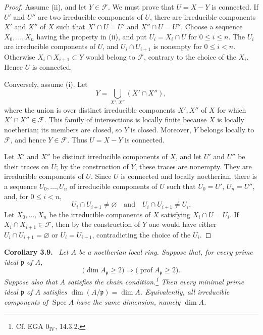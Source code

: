 \documentclass[11pt,a4paper,oneside]{book}
\providecommand{\srcpage}[1]{%
  \marginpar{\raggedright\scriptsize\color{gray}Original French p.~#1}}
\providecommand{\Spec}{\operatorname{Spec}}
\providecommand{\prof}{\operatorname{prof}}
\newenvironment{sgastatement}[1]
  {\par\addvspace{0.8\baselineskip}\noindent\textbf{#1.}\ \itshape}
  {\par\addvspace{0.35\baselineskip}}
\theoremstyle{plain}
\theoremstyle{definition}
\theoremstyle{remark}
\begin{document}
\begin{proof}
Assume (ii), and let $Y\in\mathcal F$. We must prove that $U=X-Y$ is
connected. If $U'$ and $U''$ are two irreducible components of $U$, there are
irreducible components $X'$ and $X''$ of $X$ such that
$X'\cap U=U'$ and $X''\cap U=U''$. Choose a sequence
$X_0,\ldots,X_n$ having the property in (ii), and put
$U_i=X_i\cap U$ for $0\le i\le n$. The $U_i$ are irreducible components of
$U$, and $U_i\cap U_{i+1}$ is nonempty for $0\le i<n$. Otherwise
$X_i\cap X_{i+1}\subset Y$ would belong to $\mathcal F$,\srcpage{40} contrary to the
choice of the $X_i$. Hence $U$ is connected.

Conversely, assume (i). Let
\[
  Y=\bigcup_{X',X''}(X'\cap X''),
\]
where the union is over distinct irreducible components $X',X''$ of $X$ for
which $X'\cap X''\in\mathcal F$. This family of intersections is locally
finite because $X$ is locally noetherian; its members are closed, so $Y$ is
closed. Moreover, $Y$ belongs locally to $\mathcal F$, and hence
$Y\in\mathcal F$. Thus $U=X-Y$ is connected.

Let $X'$ and $X''$ be distinct irreducible components of $X$, and let $U'$
and $U''$ be their traces on $U$; by the construction of $Y$, these traces
are nonempty. They are irreducible components of $U$. Since $U$ is connected
and locally noetherian, there is a sequence $U_0,\ldots,U_n$ of irreducible
components of $U$ such that $U_0=U'$, $U_n=U''$, and, for $0\le i<n$,
\[
  U_i\cap U_{i+1}\ne\varnothing
  \quad\text{and}\quad U_i\cap U_{i+1}\ne U_i.
\]
Let $X_0,\ldots,X_n$ be the irreducible components of $X$ satisfying
$X_i\cap U=U_i$. If $X_i\cap X_{i+1}\in\mathcal F$, then by the construction
of $Y$ one would have either $U_i\cap U_{i+1}=\varnothing$ or
$U_i=U_{i+1}$, contradicting the choice of the $U_i$.
\end{proof}


\begin{sgastatement}{Corollary 3.9}
Let $A$ be a noetherian local ring. Suppose that, for every prime ideal
$\mathfrak p$ of $A$,
\[
  \bigl(\dim A_{\mathfrak p}\ge2\bigr)
  \Longrightarrow
  \bigl(\prof A_{\mathfrak p}\ge2\bigr).
\]
Suppose also that $A$ satisfies the chain condition.\footnote{Cf. EGA
$0_{\mathrm{IV}}$, 14.3.2.} Then every minimal prime ideal $\mathfrak p$ of
$A$ satisfies $\dim(A/\mathfrak p)=\dim A$. Equivalently, all irreducible
components of $\Spec A$ have the same dimension, namely $\dim A$.
\end{sgastatement}
\end{document}
